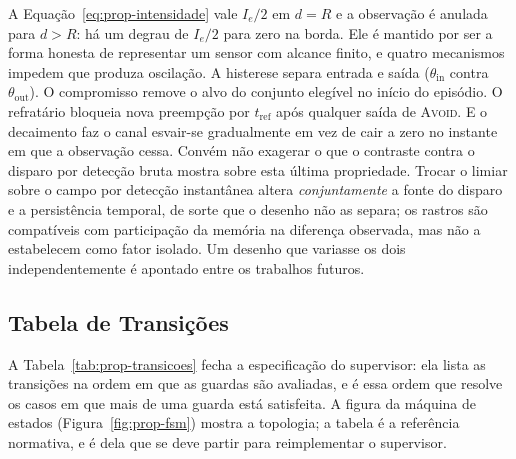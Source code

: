 A Equação~\eqref{eq:prop-intensidade} vale $I_e/2$ em $d=R$ e a observação é anulada
para $d>R$: há um degrau de $I_e/2$ para zero na borda. Ele é mantido por ser a forma
honesta de representar um sensor com alcance finito, e quatro mecanismos impedem que
produza oscilação. A histerese separa entrada e saída ($\theta_{\text{in}}$ contra
$\theta_{\text{out}}$). O compromisso remove o alvo do conjunto elegível no início do
episódio. O refratário bloqueia nova preempção por $t_{\text{ref}}$ após qualquer saída
de \textsc{Avoid}. E o decaimento faz o canal esvair-se gradualmente em vez de cair a
zero no instante em que a observação cessa.
Convém não exagerar o que o contraste contra o disparo por detecção bruta mostra sobre
esta última propriedade. Trocar o limiar sobre o campo por detecção instantânea altera
\emph{conjuntamente} a fonte do disparo e a persistência temporal, de sorte que o
desenho não as separa; os rastros são compatíveis com participação da memória na
diferença observada, mas não a estabelecem como fator isolado. Um desenho que variasse
os dois independentemente é apontado entre os trabalhos futuros.

\subsection{Tabela de Transições}

A Tabela~\ref{tab:prop-transicoes} fecha a especificação do supervisor: ela lista as
transições na ordem em que as guardas são avaliadas, e é essa ordem que resolve os
casos em que mais de uma guarda está satisfeita. A figura da máquina de estados
(Figura~\ref{fig:prop-fsm}) mostra a topologia; a tabela é a referência
normativa, e é dela que se deve partir para reimplementar o supervisor.

